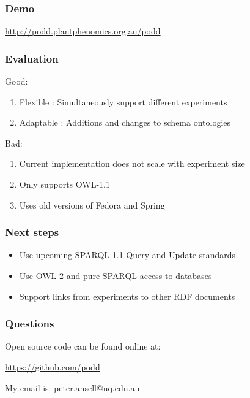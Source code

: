 \documentclass[12pt]{beamer}
\begin{document}
\bgroup
{}
\begin{frame}[plain]{}
\end{frame}
\egroup

\begin{frame}
\frametitle{Demo} 

\url{http://podd.plantphenomics.org.au/podd}

\end{frame}

\begin{frame}
\frametitle{Evaluation}

Good:

\begin{enumerate}
 \item Flexible : Simultaneously support different experiments
 \item Adaptable : Additions and changes to schema ontologies
\end{enumerate}

Bad:

\begin{enumerate}
 \item Current implementation does not scale with experiment size
 \item Only supports OWL-1.1
 \item Uses old versions of Fedora and Spring
\end{enumerate}


\end{frame}

\begin{frame}
\frametitle{Next steps}

\begin{itemize}
 \item Use upcoming SPARQL 1.1 Query and Update standards
 \item Use OWL-2 and pure SPARQL access to databases
 \item Support links from experiments to other RDF documents
\end{itemize}


\end{frame}


\begin{frame}
\frametitle{Questions}

\begin{center}
Open source code can be found online at:

\url{https://github.com/podd}

\vskip 12pt

My email is: peter.ansell@uq.edu.au
\end{center}
\end{frame}
\end{document}
